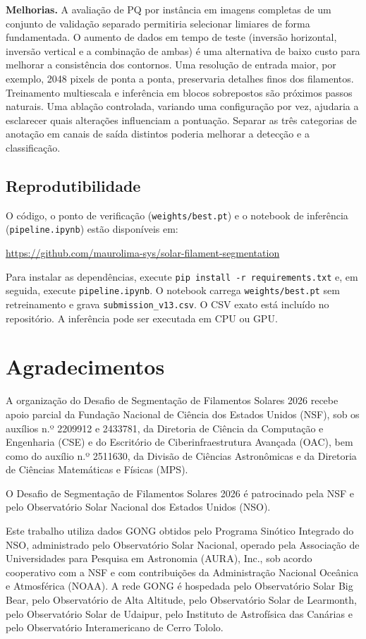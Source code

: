 \documentclass[
  article,
  11pt,
  oneside,
  a4paper,
  english,
  brazil,
  sumario=tradicional
]{abntex2}
\begin{document}
\textbf{Melhorias.} A avaliação de PQ por instância em imagens completas de um conjunto de validação separado permitiria selecionar limiares de forma fundamentada. O aumento de dados em tempo de teste (inversão horizontal, inversão vertical e a combinação de ambas) é uma alternativa de baixo custo para melhorar a consistência dos contornos. Uma resolução de entrada maior, por exemplo, 2048 pixels de ponta a ponta, preservaria detalhes finos dos filamentos. Treinamento multiescala e inferência em blocos sobrepostos são próximos passos naturais. Uma ablação controlada, variando uma configuração por vez, ajudaria a esclarecer quais alterações influenciam a pontuação. Separar as três categorias de anotação em canais de saída distintos poderia melhorar a detecção e a classificação.

\subsection{Reprodutibilidade}

O código, o ponto de verificação (\texttt{weights/best.pt}) e o notebook de inferência (\texttt{pipeline.ipynb}) estão disponíveis em:
\begin{center}
\url{https://github.com/maurolima-sys/solar-filament-segmentation}
\end{center}
Para instalar as dependências, execute \texttt{pip install -r requirements.txt} e, em seguida, execute \texttt{pipeline.ipynb}. O notebook carrega \texttt{weights/best.pt} sem retreinamento e grava \texttt{submission\_v13.csv}. O CSV exato está incluído no repositório. A inferência pode ser executada em CPU ou GPU.

\section{Agradecimentos}

A organização do Desafio de Segmentação de Filamentos Solares 2026 recebe apoio parcial da Fundação Nacional de Ciência dos Estados Unidos (NSF), sob os auxílios n.º 2209912 e 2433781, da Diretoria de Ciência da Computação e Engenharia (CSE) e do Escritório de Ciberinfraestrutura Avançada (OAC), bem como do auxílio n.º 2511630, da Divisão de Ciências Astronômicas e da Diretoria de Ciências Matemáticas e Físicas (MPS).

O Desafio de Segmentação de Filamentos Solares 2026 é patrocinado pela NSF e pelo Observatório Solar Nacional dos Estados Unidos (NSO).

Este trabalho utiliza dados GONG obtidos pelo Programa Sinótico Integrado do NSO, administrado pelo Observatório Solar Nacional, operado pela Associação de Universidades para Pesquisa em Astronomia (AURA), Inc., sob acordo cooperativo com a NSF e com contribuições da Administração Nacional Oceânica e Atmosférica (NOAA). A rede GONG é hospedada pelo Observatório Solar Big Bear, pelo Observatório de Alta Altitude, pelo Observatório Solar de Learmonth, pelo Observatório Solar de Udaipur, pelo Instituto de Astrofísica das Canárias e pelo Observatório Interamericano de Cerro Tololo.

\postextual


\end{document}
